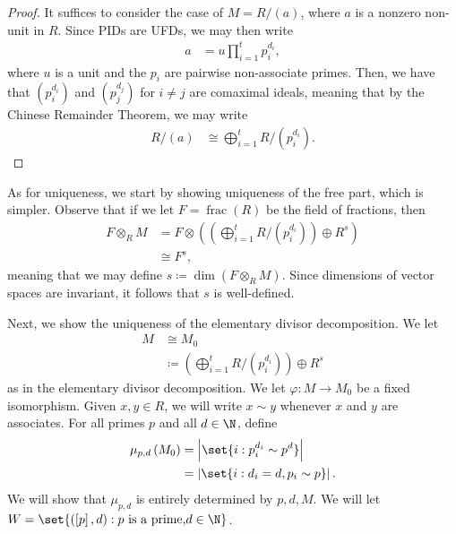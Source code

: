 \documentclass[10pt]{mypackage}
\renewcommand{\coloneq}{\coloneqq}
\begin{document}
\begin{proof}
  It suffices to consider the case of $M = R/\left( a \right)$, where $a$ is a nonzero non-unit in $R$. Since PIDs are UFDs, we may then write
  \begin{align*}
    a &= u\prod_{i=1}^{t}p_i^{d_i},
  \end{align*}
  where $u$ is a unit and the $p_i$ are pairwise non-associate primes. Then, we have that $\left( p_i^{d_i} \right)$ and $\left( p_j^{d_j} \right)$ for $i\neq j$ are comaximal ideals, meaning that by the Chinese Remainder Theorem, we may write
  \begin{align*}
    R/\left( a \right) &\cong \bigoplus_{i=1}^{t} R/\left( p_i^{d_i} \right).
  \end{align*}
\end{proof}
As for uniqueness, we start by showing uniqueness of the free part, which is simpler. Observe that if we let $F = \operatorname{frac}(R)$ be the field of fractions, then
\begin{align*}
  F\otimes_{R}M &= F\otimes \left( \left( \bigoplus_{i=1}^{t}R/\left( p_i^{d_i} \right) \right)\oplus R^{s} \right)\\
                &\cong F^{s},
\end{align*}
meaning that we may define $s \coloneq \dim\left( F\otimes_{R}M \right)$. Since dimensions of vector spaces are invariant, it follows that $s$ is well-defined.

Next, we show the uniqueness of the elementary divisor decomposition. We let
\begin{align*}
  M&\cong M_0\\
   &\coloneq \left( \bigoplus_{i=1}^{t}R/\left( p_i^{d_i} \right) \right)\oplus R^{s}
\end{align*}
as in the elementary divisor decomposition. We let $\varphi\colon M\rightarrow M_0$ be a fixed isomorphism. Given $x,y\in R$, we will write $x\sim y$ whenever $x$ and $y$ are associates. For all primes $p$ and all $d\in \N$, define
\begin{align*}
  \mu_{p,d}\left( M_0 \right) &= \left\vert \set{i : p_i^{d_i}\sim p^{d}} \right\vert\\
                              &= \left\vert \set{i : d_i = d,p_i\sim p} \right\vert.
\end{align*}
We will show that $\mu_{p,d}$ is entirely determined by $p,d,M$. We will let $W = \set{\left( \left[ p \right],d \right) : p\text{ is a prime,}d\in \N}$.
\end{document}

